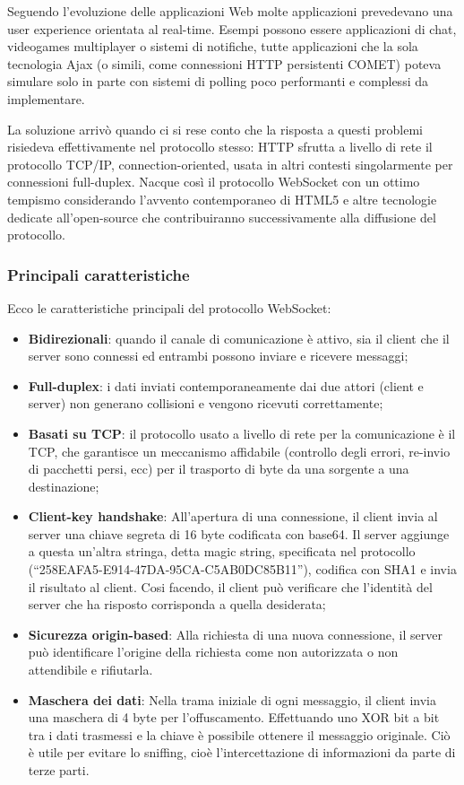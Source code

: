Seguendo l’evoluzione delle applicazioni Web molte applicazioni prevedevano una user experience orientata al real-time. Esempi possono essere applicazioni di chat, videogames multiplayer o sistemi di notifiche, tutte applicazioni che la sola tecnologia Ajax (o simili, come connessioni HTTP persistenti COMET) poteva simulare solo in parte con sistemi di polling poco performanti e complessi da implementare.

\medskip

La soluzione arrivò quando ci si rese conto che la risposta a questi problemi risiedeva effettivamente nel protocollo stesso: HTTP sfrutta a livello di rete il protocollo TCP/IP, connection-oriented, usata in altri contesti singolarmente per connessioni full-duplex. Nacque così il protocollo WebSocket con un ottimo tempismo considerando l’avvento contemporaneo di HTML5 e altre tecnologie dedicate all’open-source che contribuiranno successivamente alla diffusione del protocollo.\cite{websocket_hystory}

\medskip

\subsubsection*{Principali caratteristiche}

Ecco le caratteristiche principali del protocollo WebSocket:
\begin{itemize}
    \item \textbf{Bidirezionali}: quando il canale di comunicazione è attivo, sia il client che il server sono connessi ed entrambi possono inviare e ricevere messaggi;
    \item \textbf{Full-duplex}: i dati inviati contemporaneamente dai due attori (client e server) non generano collisioni e vengono ricevuti correttamente;
    \item \textbf{Basati su TCP}: il protocollo usato a livello di rete per la comunicazione è il TCP, che garantisce un meccanismo affidabile (controllo degli errori, re-invio di pacchetti persi, ecc) per il trasporto di byte da una sorgente a una destinazione;
    \item \textbf{Client-key handshake}: All’apertura di una connessione, il client invia al server una chiave segreta di 16 byte codificata con base64. Il server aggiunge a questa un’altra stringa, detta magic string, specificata nel protocollo (“258EAFA5-E914-47DA-95CA-C5AB0DC85B11”), codifica con SHA1 e invia il risultato al client. Cosi facendo, il client può verificare che l’identità del server che ha risposto corrisponda a quella desiderata;
    \item \textbf{Sicurezza origin-based}: Alla richiesta di una nuova connessione, il server può identificare l’origine della richiesta come non autorizzata o non attendibile e rifiutarla.
    \item \textbf{Maschera dei dati}: Nella trama iniziale di ogni messaggio, il client invia una maschera di 4 byte per l’offuscamento. Effettuando uno XOR bit a bit tra i dati trasmessi e la chiave è possibile ottenere il messaggio originale. Ciò è utile per evitare lo sniffing, cioè l’intercettazione di informazioni da parte di terze parti.
\end{itemize}

